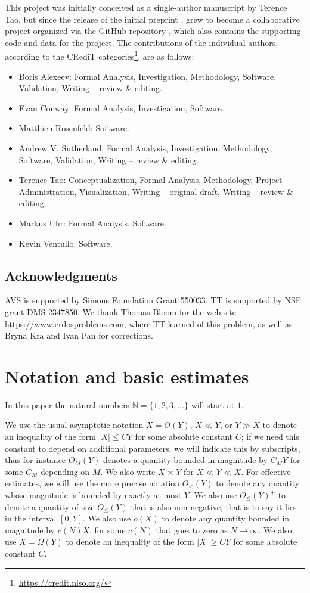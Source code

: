 \documentclass[10pt,a4paper,reqno]{amsart}
\numberwithin{equation}{section}
\theoremstyle{plain}
\theoremstyle{definition}
\newcommand\N{\mathbb{N}}
\begin{document}
This project was initially conceived as a single-author manuscript by Terence Tao, but since the release of the initial preprint \cite{tao}, grew to become a collaborative project organized via the GitHub repository \cite{github}, which also contains the supporting code and data for the project.  The contributions of the individual authors, according to the CRediT categories\footnote{\url{https://credit.niso.org/}}, are as follows:

\begin{itemize}
\item Boris Alexeev: Formal Analysis, Investigation, Methodology, Software, Validation, Writing -- review \& editing.
\item Evan Conway: Formal Analysis, Investigation, Software.
\item Matthieu Rosenfeld: Software.
\item Andrew V. Sutherland: Formal Analysis, Investigation, Methodology, Software, Validation, Writing -- review \& editing.
\item Terence Tao: Conceptualization, Formal Analysis, Methodology, Project Administration, Visualization, Writing -- original draft, Writing -- review \& editing.
\item Markus Uhr: Formal Analysis, Software.
\item Kevin Ventullo: Software.
\end{itemize}

\subsection{Acknowledgments}

AVS is supported by Simons Foundation Grant 550033.  TT is supported by NSF grant DMS-2347850.  We thank Thomas Bloom for the web site \url{https://www.erdosproblems.com}, where TT learned of this problem, as well as Bryna Kra and Ivan Pan for  corrections.


\section{Notation and basic estimates}

In this paper the natural numbers $\N=\{1,2,3,\dots\}$ will start at $1$.

We use the usual asymptotic notation $X = O(Y)$, $X \ll Y$, or $Y \gg X$ to denote an inequality of the form $|X| \leq CY$ for some absolute constant $C$; if we need this constant to depend on additional parameters, we will indicate this by subscripts, thus for instance $O_M(Y)$ denotes a quantity bounded in magnitude by $C_M Y$ for some $C_M$ depending on $M$.  We also write $X \asymp Y$ for $X \ll Y \ll X$. For effective estimates, we will use the more precise notation $O_{\leq}(Y)$ to denote any quantity whose magnitude is bounded by exactly at most $Y$. We also use $O_{\leq}(Y)^+$ to denote a quantity of size $O_{\leq}(Y)$ that is also non-negative, that is to say it lies in the interval $[0,Y]$.  We also use $o(X)$ to denote any quantity bounded in magnitude by $c(N) X$, for some $c(N)$ that goes to zero as $N \to \infty$. We also use $X = \Omega(Y)$ to denote an inequality of the form $|X| \geq CY$ for some absolute constant $C$. 
\end{document}
